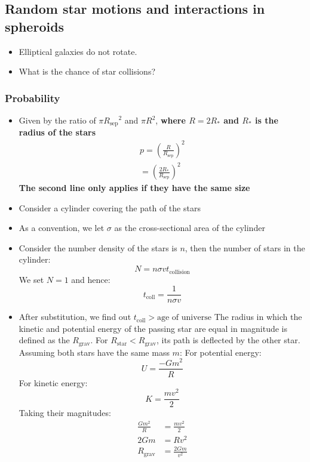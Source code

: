 \documentclass{article}
\begin{document}
\subsection{Random star motions and interactions in spheroids}
\begin{itemize}
\item Elliptical galaxies do not rotate.
\item What is the chance of star collisions?
\end{itemize}
\subsubsection{Probability}
\begin{itemize}
\item Given by the ratio of $\pi{R_\text{sep}}^2$ and $\pi R^2$, \textbf{where $R=2R_*$ and $R_*$ is the radius of the stars} 
\begin{align}
p={\left(\frac{R}{R_\text{sep}}\right)}^2\\
={\left(\frac{2R_*}{R_\text{sep}}\right)}^2 
\end{align}
\textbf{The second line only applies if they have the same size}
\end{itemize}
\begin{itemize}
\item Consider a cylinder covering the path of the stars
\item As a convention, we let $\sigma$ as the cross-sectional area of the cylinder
\item Consider the number density of the stars is $n$, then the number of stars in the cylinder:
\begin{equation}
N=n \sigma vt_\text{collision}
\end{equation}
We set $N=1$ and hence:
\begin{equation}
t_\text{coll}=\frac{1}{n \sigma v}
\end{equation}
\item After substitution, we find out $t_\text{coll} > \text{age of universe}$
The radius in which the kinetic and potential energy of the passing star are equal in magnitude is defined as the $R_\text{grav}$. For $R_\text{star}<R_\text{grav} $, its path is deflected by the other star. Assuming both stars have the same mass $m$:
For potential energy:
\begin{equation}
U=\frac{-Gm^2}{R}
\end{equation}
For kinetic energy:
\begin{equation}
K=\frac{mv^2}{2}
\end{equation}
Taking their magnitudes:
\begin{align}
\frac{Gm^2}{R}&=\frac{mv^2}{2}\\
2Gm&=Rv^2\\
R_\text{grav}&=\frac{2Gm}{v^2}
\end{align}
\end{itemize}
\end{document}
